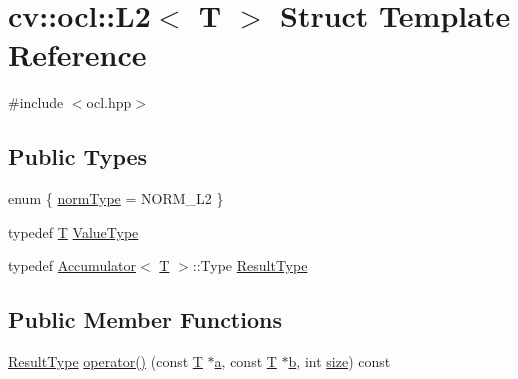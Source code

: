 \hypertarget{structcv_1_1ocl_1_1L2}{\section{cv\-:\-:ocl\-:\-:L2$<$ T $>$ Struct Template Reference}
\label{structcv_1_1ocl_1_1L2}
}


{\ttfamily \#include $<$ocl.\-hpp$>$}

\subsection*{Public Types}
\begin{DoxyCompactItemize}
\item 
enum \{ \hyperlink{structcv_1_1ocl_1_1L2_abd0f5659dd245f95a21d0f625e65058ba7b703dc3fd348b6c3447078fa6fde351}{norm\-Type} = N\-O\-R\-M\-\_\-\-L2
 \}
\item 
typedef \hyperlink{calib3d_8hpp_a3efb9551a871ddd0463079a808916717}{T} \hyperlink{structcv_1_1ocl_1_1L2_a1ddbd975d6a27d06b4c3bda8466435fe}{Value\-Type}
\item 
typedef \hyperlink{structcv_1_1ocl_1_1Accumulator}{Accumulator}$<$ \hyperlink{calib3d_8hpp_a3efb9551a871ddd0463079a808916717}{T} $>$\-::Type \hyperlink{structcv_1_1ocl_1_1L2_a637a30d36a2d2c9b1a71e6a13d4e0709}{Result\-Type}
\end{DoxyCompactItemize}
\subsection*{Public Member Functions}
\begin{DoxyCompactItemize}
\item 
\hyperlink{structcv_1_1ocl_1_1L2_a637a30d36a2d2c9b1a71e6a13d4e0709}{Result\-Type} \hyperlink{structcv_1_1ocl_1_1L2_a67460983a2f6a389370d4338aa4c5107}{operator()} (const \hyperlink{calib3d_8hpp_a3efb9551a871ddd0463079a808916717}{T} $\ast$\hyperlink{legacy_8hpp_a1031d0e0a97a340abfe0a6ab9e831045}{a}, const \hyperlink{calib3d_8hpp_a3efb9551a871ddd0463079a808916717}{T} $\ast$\hyperlink{legacy_8hpp_ac04272e8ca865b8fba18d36edae9fd2a}{b}, int \hyperlink{legacy_8hpp_ae97003f8d5c64cdfb99f6f2606d121b6}{size}) const 
\end{DoxyCompactItemize}


